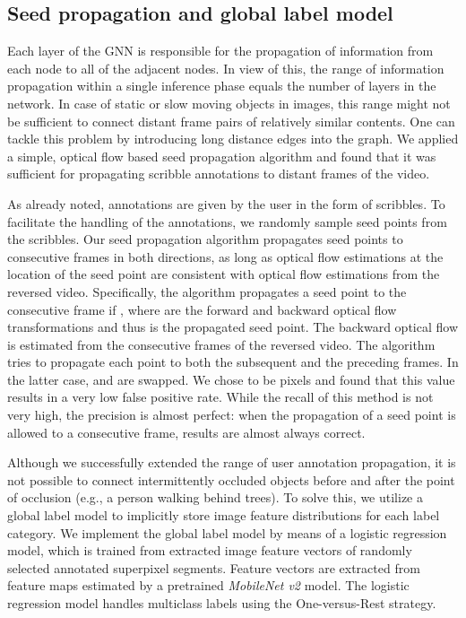 \documentclass[conference]{IEEEtran}
\begin{document}
\subsection{Seed propagation and global label model}

Each layer of the GNN is responsible for the propagation of information from each node to all of the adjacent nodes. In view of this, the range of information propagation within a single inference phase equals the number of layers in the network. In case of static or slow moving objects in images, this range might not be sufficient to connect distant frame pairs of relatively similar contents. One can tackle this problem by  introducing long distance edges into the graph. We applied a simple,  optical flow based seed propagation algorithm and found that it was sufficient for propagating scribble annotations to distant frames of the video. 

As already noted, annotations are given by the user in the form of scribbles. To facilitate the handling of the annotations, we randomly sample seed points from the scribbles. Our seed propagation algorithm propagates seed points to consecutive frames in both directions, as long as optical flow estimations at the location of the seed point are consistent with optical flow estimations from the reversed video. Specifically, the algorithm propagates a seed point  to the consecutive frame if , where  are the forward and backward optical flow transformations and thus  is the propagated seed point. The backward optical flow is estimated from the consecutive frames of the reversed video. The algorithm tries to propagate each point to both the subsequent and the preceding frames. In the latter case,  and  are swapped. We chose  to be  pixels and  found that this value results in a very low false positive rate. While the recall of this method is not very high, the precision is almost perfect: when the propagation of a seed point is allowed to a consecutive frame, results are almost always correct.

Although we successfully extended the range of user annotation propagation, it is not possible to connect intermittently occluded objects before and after the point of occlusion (e.g., a person walking behind trees). To solve this, we utilize a global label model to implicitly store image feature distributions for each label category. We implement the global label model by means of a logistic regression model, which is trained from extracted image feature vectors of randomly selected annotated superpixel segments. Feature vectors are extracted from feature maps estimated by a pretrained \textit{MobileNet v2} \cite{mobilenet} model. The logistic regression model handles multiclass labels using the One-versus-Rest strategy.
\end{document}
